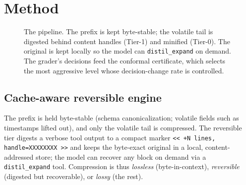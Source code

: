 \documentclass{article}
\begin{document}
\section{Method}
\label{sec:method}

\begin{figure}[t]
\centering
{}
\caption{The pipeline. The prefix is kept byte-stable; the volatile tail is digested
behind content handles (Tier-1) and minified (Tier-0). The original is kept locally
so the model can \texttt{distil\_expand} on demand. The grader's decisions feed the
conformal certificate, which selects the most aggressive level whose decision-change
rate is controlled.}
\label{fig:pipeline}
\end{figure}

\subsection{Cache-aware reversible engine}
The prefix is held byte-stable (schema canonicalization; volatile fields such as
timestamps lifted out), and only the volatile tail is compressed. The reversible
tier digests a verbose tool output to a compact marker
\verb|<< +N lines, handle=XXXXXXXX >>| and keeps the byte-exact original in a local,
content-addressed store; the model can recover any block on demand via a
\texttt{distil\_expand} tool. Compression is thus \emph{lossless} (byte-in-context),
\emph{reversible} (digested but recoverable), or \emph{lossy} (the rest).
\end{document}
